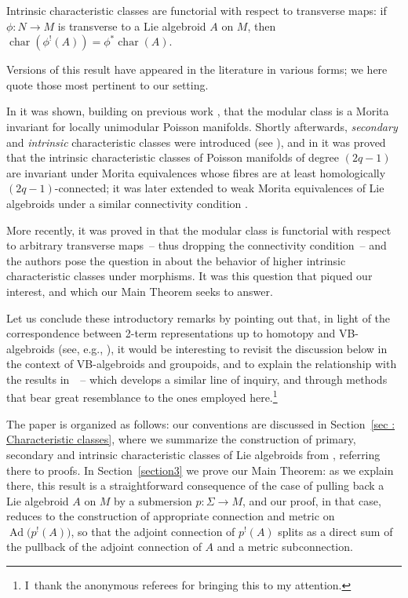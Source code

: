\begin{theorem*}\label{thm : pullback of char} Intrinsic characteristic classes are functorial with respect to transverse maps: if $\phi\colon N \to M$ is transverse to a Lie algebroid $A$ on $M$, then $\operatorname{char}(\phi^!(A)) = \phi^*\operatorname{char}(A)$.
\end{theorem*}

Versions of this result have appeared in the literature in various forms; we here quote those most pertinent to our setting.

In \cite[Theorem 4.2]{GinzGol} it was shown, building on previous work \cite{GinzLu}, that the modular class is a Morita invariant for locally unimodular Poisson manifolds. Shortly afterwards, \emph{secondary} and \emph{intrinsic} characteristic classes were introduced (see \cite{CrainicNL,Cr_VEst,CrFer_Char,RuiAdv,Kubarski}), and in \cite[Corollary 8]{Cr_VEst} it was proved that the intrinsic characteristic classes of Poisson manifolds of degree $(2q-1)$ are invariant under Morita equivalences whose fibres are at least homologically $(2q-1)$-connected; it was later extended to weak Morita equivalences of Lie algebroids under a similar connectivity condition \cite[Example~6.16]{Ginz01}.

More recently, it was proved in \cite[Theorem~3.10]{YvetteLaurentAlan} that the modular class is functorial with respect to arbitrary transverse maps~-- thus dropping the connectivity condition~-- and the authors pose the question in \cite[(iii), p.~729]{YvetteLaurentAlan} about the behavior of higher intrinsic characteristic classes under morphisms. It was this question that piqued our interest, and which our Main Theorem seeks to answer.

Let us conclude these introductory remarks by pointing out that, in light of the correspondence between 2-term representations up to homotopy and VB-algebroids (see, e.g., \cite{GraciaMehta}), it would be interesting to revisit the discussion below in the context of VB-algebroids and groupoids, and to explain the relationship with the results in~\cite{HoyoOrtiz}~-- which develops a similar line of inquiry, and through methods that bear great resemblance to the ones employed here.\footnote{I~thank the anonymous referees for bringing this to my attention.}

The paper is organized as follows: our conventions are discussed in Section~\ref{sec : Characteristic classes}, where we summarize the construction of primary, secondary and intrinsic characteristic classes of Lie algebroids from \cite{CrainicNL,CrFer_Char}, referring there to proofs. In Section~\ref{section3} we prove our Main Theorem: as we explain there, this result is a straightforward consequence of the case of pulling back a Lie algebroid $A$ on $M$ by a submersion $p\colon \Sigma\to M$, and our proof, in that case, reduces to the construction of appropriate connection and metric on $\operatorname{Ad}\big(p^!(A)\big)$, so that the adjoint connection of $p^!(A)$ splits as a direct sum of the pullback of the adjoint connection of $A$ and a metric subconnection.


